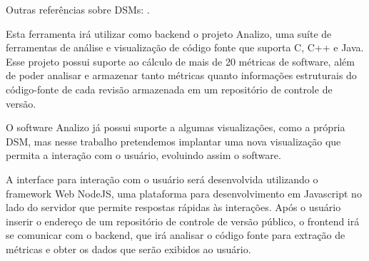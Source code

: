 \documentclass{article}
\begin{document}
Outras referências sobre DSMs:
\cite{AKnowledgeBased, AnalyzingTheEvolution, AntaresDSM, ApplyingTheDesign,
DesignSuite, EfficientOrganizing, ReachabilityMatrices, TheStructureAndValue}.



Esta ferramenta irá utilizar como backend o projeto Analizo, uma suíte
de ferramentas de análise e visualização de código fonte que suporta C,
C++ e Java. Esse projeto possui suporte ao cálculo de mais de 20
métricas de software, além de poder analisar e armazenar tanto métricas
quanto informações estruturais do código-fonte de cada revisão
armazenada em um repositório de controle de versão.

O software Analizo já possui suporte a algumas visualizações, como a
própria DSM, mas nesse trabalho pretendemos implantar uma nova
visualização que permita a interação com o usuário, evoluindo assim o
software.

A interface para interação com o usuário será desenvolvida utilizando o
framework Web NodeJS, uma plataforma para desenvolvimento em Javascript
no lado do servidor que permite respostas rápidas às interações. Após o
usuário inserir o endereço de um repositório de controle de versão
público, o frontend irá se comunicar com o backend, que irá analisar o
código fonte para extração de métricas e obter os dados que serão
exibidos ao usuário.


\end{document}
